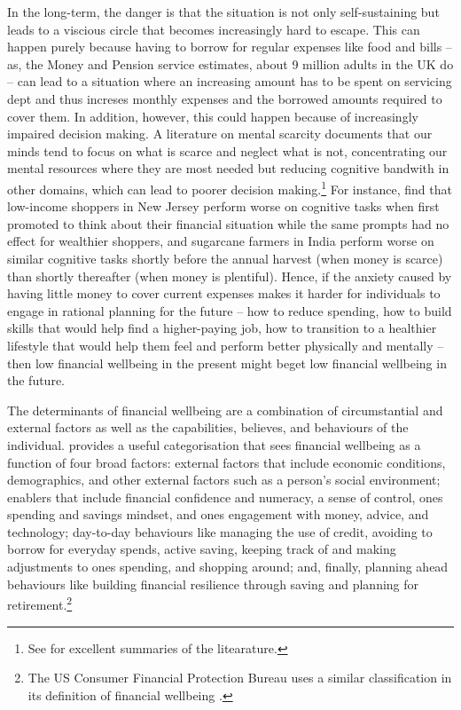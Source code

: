 In the long-term, the danger is that the situation is not only self-sustaining
but leads to a viscious circle that becomes increasingly hard to escape. This
can happen purely because having to borrow for regular expenses like food and
bills -- as, the Money and Pension service estimates, about 9 million adults in
the UK do \citep{mps2018building} -- can lead to a situation where an
increasing amount has to be spent on servicing dept and thus increses monthly
expenses and the borrowed amounts required to cover them. In addition, however,
this could happen because of increasingly impaired decision making. A
literature on mental scarcity documents that our minds tend to focus on what is
scarce and neglect what is not, concentrating our mental resources where they
are most needed but reducing cognitive bandwith in other domains, which can
lead to poorer decision making.\footnote{See \citet{shah2012some,
    mullainathan2013scarcity, haushofer2014psychology} for excellent summaries
of the litearature.} For instance, \citet{mani2013poverty} find that low-income
shoppers in New Jersey perform worse on cognitive tasks when first promoted to
think about their financial situation while the same prompts had no effect for
wealthier shoppers, and sugarcane farmers in India perform worse on similar
cognitive tasks shortly before the annual harvest (when money is scarce) than
shortly thereafter (when money is plentiful). Hence, if the anxiety caused by
having little money to cover current expenses makes it harder for individuals
to engage in rational planning for the future -- how to reduce spending, how to
build skills that would help find a higher-paying job, how to transition to a
healthier lifestyle that would help them feel and perform better physically and
mentally -- then low financial wellbeing in the present might beget low
financial wellbeing in the future.

The determinants of financial wellbeing are a combination of circumstantial and
external factors as well as the capabilities, believes, and behaviours of the
individual. \citet{mps2018building} provides a useful categorisation that sees
financial wellbeing as a function of four broad factors: external factors that
include economic conditions, demographics, and other external factors such as a
person's social environment; enablers that include financial confidence and
numeracy, a sense of control, ones spending and savings mindset, and ones
engagement with money, advice, and technology; day-to-day behaviours like
managing the use of credit, avoiding to borrow for everyday spends, active
saving, keeping track of and making adjustments to ones spending, and shopping
around; and, finally, planning ahead behaviours like building financial
resilience through saving and planning for retirement.\footnote{The US Consumer
Financial Protection Bureau uses a similar classification in its definition of
financial wellbeing \citep{cfpb2015financial}.}


